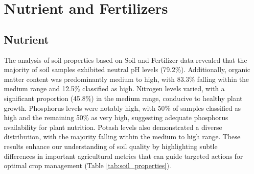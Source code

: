 

\section{Nutrient and Fertilizers}

\subsection{Nutrient}

The analysis of soil properties based on Soil and Fertilizer data revealed that the majority of soil samples exhibited neutral pH levels (79.2\%). Additionally, organic matter content was predominantly medium to high, with 83.3\% falling within the medium range and 12.5\% classified as high. Nitrogen levels varied, with a significant proportion (45.8\%) in the medium range, conducive to healthy plant growth. Phosphorus levels were notably high, with 50\% of samples classified as high and the remaining 50\% as very high, suggesting adequate phosphorus availability for plant nutrition. Potash levels also demonstrated a diverse distribution, with the majority falling within the medium to high range. These results enhance our understanding of soil quality by highlighting subtle differences in important agricultural metrics that can guide targeted actions for optimal crop management (Table \ref{tab:soil_properties}).

